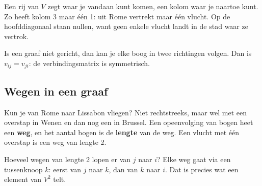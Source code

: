 Een rij van $V$ zegt waar je vandaan kunt komen, een kolom waar je naartoe kunt. Zo heeft kolom 3 maar één 1: uit Rome vertrekt maar één vlucht. Op de hoofddiagonaal staan nullen, want geen enkele vlucht landt in de stad waar ze vertrok.

Is een graaf niet gericht, dan kan je elke boog in twee richtingen volgen. Dan is $v_{ij} = v_{ji}$: de verbindingsmatrix is symmetrisch.


\begin{oefeningen}
\end{oefeningen}

\subsection{Wegen in een graaf}

Kun je van Rome naar Lissabon vliegen? Niet rechtstreeks, maar wel met een overstap in Wenen en dan nog een in Brussel. Een opeenvolging van bogen heet een \textbf{weg}, en het aantal bogen is de \textbf{lengte} van de weg. Een vlucht met één overstap is een weg van lengte 2.

Hoeveel wegen van lengte 2 lopen er van $j$ naar $i$? Elke weg gaat via een tussenknoop $k$: eerst van $j$ naar $k$, dan van $k$ naar $i$. Dat is precies wat een element van $V^2$ telt.

